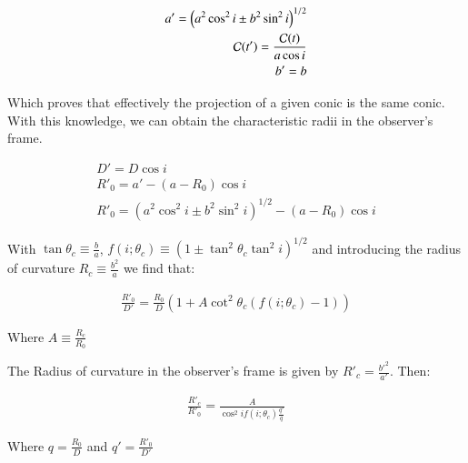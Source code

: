 \begin{align}
a' = \left(a^2\cos^2 i \pm b^2\sin^2 i\right)^{1/2} \\
\mathcal{C}(t') = \frac{\mathcal{C}(t)}{a\cos i} \\
b' = b
\end{align} 

Which proves that effectively the projection of a given conic is the same conic. With this knowledge, we can obtain the characteristic radii in
the observer's frame.

\begin{align}
D' = D\cos i \\
R'_0 = a' - (a-R_0)\cos i \\
R'_0 = \left(a^2\cos^2 i \pm b^2\sin^2 i\right)^{1/2}  - (a-R_0)\cos i
\end{align}

With $\tan\theta_c\equiv \frac{b}{a}$,  $f(i;\theta_c)\equiv\left(1\pm\tan^2\theta_c\tan^2i\right)^{1/2}$ and introducing the
radius of curvature $R_c\equiv \frac{b^2}{a}$ we find that:

\begin{align}
\frac{R'_0}{D'}=\frac{R_0}{D}\left(1+A\cot^2\theta_c(f(i;\theta_c)-1) \right)
\end{align}

Where $A\equiv \frac{R_c}{R_0}$

The Radius of curvature in the observer's frame is given by $R'_c=\frac{b'^2}{a'}$. Then:

\begin{align}
\frac{R'_c}{R'_0} = \frac{A}{\cos^2 i f(i;\theta_c)\frac{q'}{q}}
\end{align}

Where $q=\frac{R_0}{D}$ and $q' = \frac{R'_0}{D'}$


